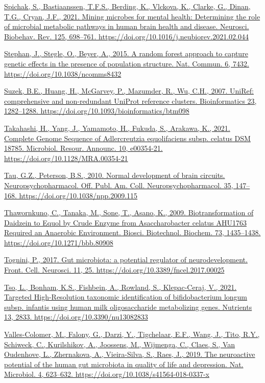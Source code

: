 \documentclass[
]{article}
\begin{document}
\href{https://www.zotero.org/google-docs/?uydJ8e}{Spichak, S.,
Bastiaanssen, T.F.S., Berding, K., Vlckova, K., Clarke, G., Dinan, T.G.,
Cryan, J.F., 2021. Mining microbes for mental health: Determining the
role of microbial metabolic pathways in human brain health and disease.
Neurosci. Biobehav. Rev. 125, 698--761.
https://doi.org/10.1016/j.neubiorev.2021.02.044}

\href{https://www.zotero.org/google-docs/?uydJ8e}{Stephan, J., Stegle,
O., Beyer, A., 2015. A random forest approach to capture genetic effects
in the presence of population structure. Nat. Commun. 6, 7432.
https://doi.org/10.1038/ncomms8432}

\href{https://www.zotero.org/google-docs/?uydJ8e}{Suzek, B.E., Huang,
H., McGarvey, P., Mazumder, R., Wu, C.H., 2007. UniRef: comprehensive
and non-redundant UniProt reference clusters. Bioinformatics 23,
1282--1288. https://doi.org/10.1093/bioinformatics/btm098}

\href{https://www.zotero.org/google-docs/?uydJ8e}{Takahashi, H., Yang,
J., Yamamoto, H., Fukuda, S., Arakawa, K., 2021. Complete Genome
Sequence of Adlercreutzia equolifaciens subsp. celatus DSM 18785.
Microbiol. Resour. Announc. 10, e00354-21.
https://doi.org/10.1128/MRA.00354-21}

\href{https://www.zotero.org/google-docs/?uydJ8e}{Tau, G.Z., Peterson,
B.S., 2010. Normal development of brain circuits. Neuropsychopharmacol.
Off. Publ. Am. Coll. Neuropsychopharmacol. 35, 147--168.
https://doi.org/10.1038/npp.2009.115}

\href{https://www.zotero.org/google-docs/?uydJ8e}{Thawornkuno, C.,
Tanaka, M., Sone, T., Asano, K., 2009. Biotransformation of Daidzein to
Equol by Crude Enzyme from Asaccharobacter celatus AHU1763 Required an
Anaerobic Environment. Biosci. Biotechnol. Biochem. 73, 1435--1438.
https://doi.org/10.1271/bbb.80908}

\href{https://www.zotero.org/google-docs/?uydJ8e}{Tognini, P., 2017. Gut
microbiota: a potential regulator of neurodevelopment. Front. Cell.
Neurosci. 11, 25. https://doi.org/10.3389/fncel.2017.00025}

\href{https://www.zotero.org/google-docs/?uydJ8e}{Tso, L., Bonham, K.S.,
Fishbein, A., Rowland, S., Klepac-Ceraj, V., 2021. Targeted
High-Resolution taxonomic identification of bifidobacterium longum
subsp. infantis using human milk oligosaccharide metabolizing genes.
Nutrients 13, 2833. https://doi.org/10.3390/nu13082833}

\href{https://www.zotero.org/google-docs/?uydJ8e}{Valles-Colomer, M.,
Falony, G., Darzi, Y., Tigchelaar, E.F., Wang, J., Tito, R.Y., Schiweck,
C., Kurilshikov, A., Joossens, M., Wijmenga, C., Claes, S., Van
Oudenhove, L., Zhernakova, A., Vieira-Silva, S., Raes, J., 2019. The
neuroactive potential of the human gut microbiota in quality of life and
depression. Nat. Microbiol. 4, 623--632.
https://doi.org/10.1038/s41564-018-0337-x}
\end{document}
